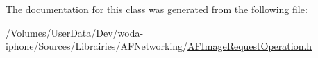 The documentation for this class was generated from the following file\-:\begin{DoxyCompactItemize}
\item 
/\-Volumes/\-User\-Data/\-Dev/woda-\/iphone/\-Sources/\-Librairies/\-A\-F\-Networking/\hyperlink{_a_f_image_request_operation_8h}{A\-F\-Image\-Request\-Operation.\-h}\end{DoxyCompactItemize}
